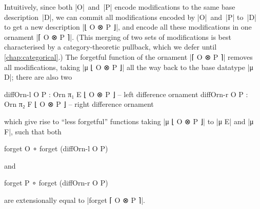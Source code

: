 Intuitively, since both |O|~and~|P| encode modifications to the same base description~|D|, we can commit all modifications encoded by |O|~and~|P| to~|D| to get a new description |⌊ O ⊗ P ⌋|, and encode all these modifications in one ornament |⌈ O ⊗ P ⌉|.
(This merging of two sets of modifications is best characterised by a category-theoretic pullback, which we defer until \autoref{chap:categorical}.)
The forgetful function of the ornament |⌈ O ⊗ P ⌉| removes all modifications, taking |μ ⌊ O ⊗ P ⌋| all the way back to the base datatype |μ D|; there are also two 
\begin{code}
diffOrn-l  O P : Orn π₁  E  ⌊ O ⊗ P ⌋  -- left difference ornament
diffOrn-r  O P : Orn π₂  F  ⌊ O ⊗ P ⌋  -- right difference ornament
\end{code}
which give rise to ``less forgetful'' functions taking |μ ⌊ O ⊗ P ⌋| to |μ E| and |μ F|, such that both
\savecolumns
\begin{code}
forget O  ∘ forget (diffOrn-l  O P)
\end{code}
and
\restorecolumns
\begin{code}
forget P  ∘ forget (diffOrn-r  O P)
\end{code}
are extensionally equal to |forget ⌈ O ⊗ P ⌉|.


